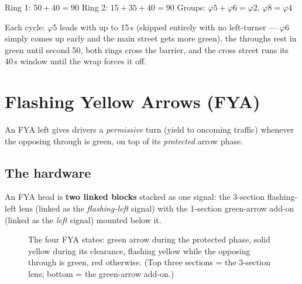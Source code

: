 \documentclass[11pt]{article}
\newcommand{\ph}[1]{\ensuremath{\varphi#1}}
\begin{document}
Ring 1: $50+40=90$ \checkmark\quad Ring 2: $15+35+40=90$ \checkmark\quad
Groups: $\ph{5}+\ph{6}=\ph{2}$, $\ph{8}=\ph{4}$ \checkmark

Each cycle: \ph{5} leads with up to 15\,s (skipped entirely with no left-turner —
\ph{6} simply comes up early and the main street gets more green), the throughs
rest in green until second 50, both rings cross the barrier, and the cross street
runs its 40\,s window until the wrap forces it off.

\section{Flashing Yellow Arrows (FYA)}\label{sec:fya}

An FYA left gives drivers a \emph{permissive} turn (yield to oncoming traffic)
whenever the opposing through is green, on top of its \emph{protected} arrow phase.

\subsection{The hardware}

An FYA head is \textbf{two linked blocks} stacked as one signal: the 3-section
flashing-left lens (linked as the \emph{flashing-left} signal) with the 1-section
green-arrow add-on (linked as the \emph{left} signal) mounted below it.

\begin{figure}[H]
\centering
{}
\caption{The four FYA states: green arrow during the protected phase, solid yellow
during its clearance, flashing yellow while the opposing through is green, red
otherwise. (Top three sections = the 3-section lens; bottom = the green-arrow
add-on.)}
\label{fig:fya}
\end{figure}
\end{document}
